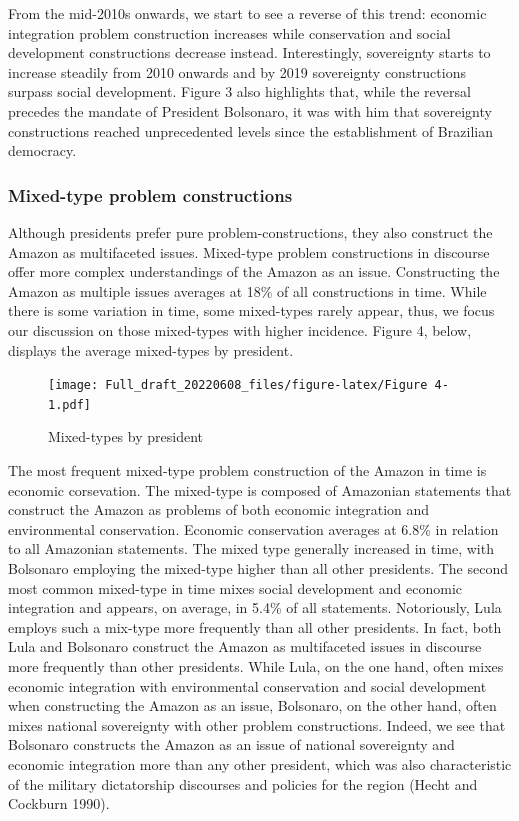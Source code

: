 \documentclass[
]{article}
\begin{document}
From the mid-2010s onwards, we start to see a reverse of this trend:
economic integration problem construction increases while conservation
and social development constructions decrease instead. Interestingly,
sovereignty starts to increase steadily from 2010 onwards and by 2019
sovereignty constructions surpass social development. Figure 3 also
highlights that, while the reversal precedes the mandate of President
Bolsonaro, it was with him that sovereignty constructions reached
unprecedented levels since the establishment of Brazilian democracy.

\hypertarget{mixed-type-problem-constructions}{%
\subsubsection{Mixed-type problem
constructions}\label{mixed-type-problem-constructions}}

Although presidents prefer pure problem-constructions, they also
construct the Amazon as multifaceted issues. Mixed-type problem
constructions in discourse offer more complex understandings of the
Amazon as an issue. Constructing the Amazon as multiple issues averages
at 18\% of all constructions in time. While there is some variation in
time, some mixed-types rarely appear, thus, we focus our discussion on
those mixed-types with higher incidence. Figure 4, below, displays the
average mixed-types by president.

\begin{figure}
\centering
\texttt{[image: Full\_draft\_20220608\_files/figure-latex/Figure 4-1.pdf]}
\caption{Mixed-types by president}
\end{figure}

The most frequent mixed-type problem construction of the Amazon in time
is economic corsevation. The mixed-type is composed of Amazonian
statements that construct the Amazon as problems of both economic
integration and environmental conservation. Economic conservation
averages at 6.8\% in relation to all Amazonian statements. The mixed
type generally increased in time, with Bolsonaro employing the
mixed-type higher than all other presidents. The second most common
mixed-type in time mixes social development and economic integration and
appears, on average, in 5.4\% of all statements. Notoriously, Lula
employs such a mix-type more frequently than all other presidents. In
fact, both Lula and Bolsonaro construct the Amazon as multifaceted
issues in discourse more frequently than other presidents. While Lula,
on the one hand, often mixes economic integration with environmental
conservation and social development when constructing the Amazon as an
issue, Bolsonaro, on the other hand, often mixes national sovereignty
with other problem constructions. Indeed, we see that Bolsonaro
constructs the Amazon as an issue of national sovereignty and economic
integration more than any other president, which was also characteristic
of the military dictatorship discourses and policies for the region
(Hecht and Cockburn 1990).
\end{document}
